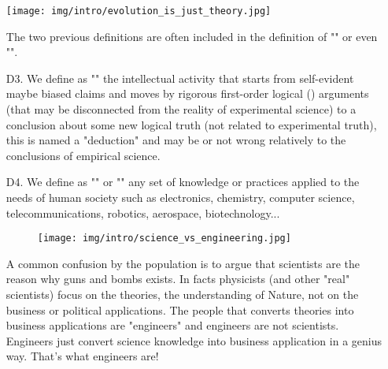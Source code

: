 \begin{itemize}
	
	\begin{center}
		\texttt{[image: img/intro/evolution\_is\_just\_theory.jpg]}
	\end{center}

	\begin{tcolorbox}[title=Remark,arc=10pt,breakable,drop lifted shadow,
  skin=enhanced,
  skin first is subskin of={enhancedfirst}{arc=10pt,no shadow},
  skin middle is subskin of={enhancedmiddle}{arc=10pt,no shadow},
  skin last is subskin of={enhancedlast}{drop lifted shadow}]
The two previous definitions are often included in the definition of "" or even "".
	\end{tcolorbox}
	
	\item[D3.] We define as "" the intellectual activity that starts from self-evident maybe biased claims and moves by rigorous first-order logical () arguments (that may be disconnected from the reality of experimental science) to a conclusion about some new logical truth (not related to experimental truth), this is named a "deduction" and may be or not wrong relatively to the conclusions of empirical science.
	
	\item[D4.] We define as "" or "" any set of knowledge or practices applied to the needs of human society such as electronics, chemistry, computer science, telecommunications, robotics, aerospace, biotechnology... 
	
	\begin{figure}[H]
		\centering
		\texttt{[image: img/intro/science\_vs\_engineering.jpg]}
	\end{figure} 
	
	\begin{tcolorbox}[title=Remark,arc=10pt,breakable,drop lifted shadow,
  skin=enhanced,
  skin first is subskin of={enhancedfirst}{arc=10pt,no shadow},
  skin middle is subskin of={enhancedmiddle}{arc=10pt,no shadow},
  skin last is subskin of={enhancedlast}{drop lifted shadow}]
	A common confusion by the population is to argue that scientists are the reason why guns and bombs exists. In facts physicists (and other "real" scientists) focus on the theories, the understanding of Nature, not on the business or political applications. The people that converts theories into business applications are "engineers" and engineers are not scientists. Engineers just convert science knowledge into business application in a genius way. That's what engineers are!
	\end{tcolorbox}


\end{itemize}
